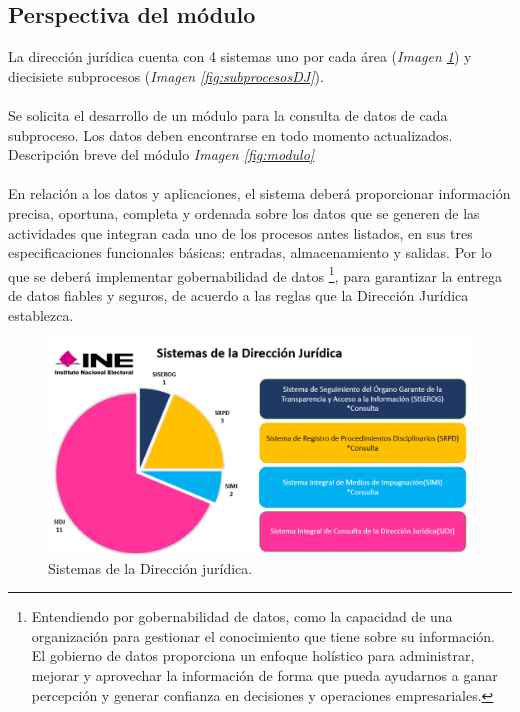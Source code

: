 \documentclass[../reportesINE.tex]{subfiles}
\begin{document}
\subsection{Perspectiva del módulo}
La dirección jurídica cuenta con 4 sistemas uno por cada área (\textit{Imagen \ref{fig:sistemasDJ}}) y diecisiete subprocesos (\textit{Imagen \ref{fig:subprocesosDJ}}). 
\\ \\
Se solicita el desarrollo de un módulo para la consulta de datos de cada subproceso. Los datos deben encontrarse en todo momento actualizados. Descripción breve del módulo \textit{Imagen \ref{fig:modulo}} 
\\ \\
En relación a los datos y aplicaciones, el sistema deberá proporcionar información precisa, oportuna, completa y ordenada sobre los datos que se generen de las actividades que integran cada uno de los procesos antes listados, en sus tres especificaciones funcionales básicas: entradas, almacenamiento y salidas. Por lo que se deberá implementar gobernabilidad de datos \footnote{Entendiendo por gobernabilidad de datos, como la capacidad de una organización para gestionar el conocimiento que tiene sobre su información. El gobierno de datos proporciona un enfoque holístico para administrar, mejorar y aprovechar la información de forma que pueda ayudarnos a ganar percepción y generar confianza en decisiones y operaciones empresariales.}, para garantizar la entrega de datos fiables y seguros, de acuerdo a las reglas que la Dirección Jurídica establezca.

\begin{figure}[h]
  \centering
  \includegraphics[width=\linewidth]{img/sistemasDJ.PNG}
  \caption{Sistemas de la Dirección jurídica.}
  \label{fig:sistemasDJ}
\end{figure}
\end{document}
